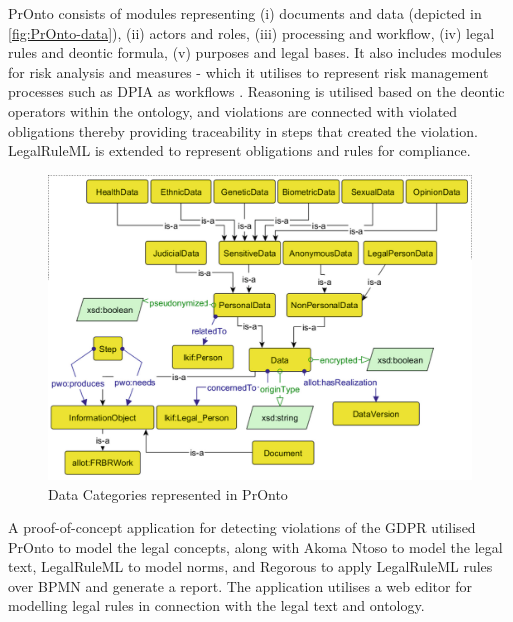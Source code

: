 PrOnto consists of modules representing (i) documents and data
(depicted in \autoref{fig:PrOnto-data}), (ii) actors and roles, (iii)
processing and workflow, (iv) legal rules and deontic formula, (v)
purposes and legal bases. It also includes modules for risk analysis
and measures - which it utilises to represent risk management
processes such as DPIA as workflows
\cite{palmirani_pronto_2018}. Reasoning is utilised based on the
deontic operators within the ontology, and violations are connected
with violated obligations thereby providing traceability in steps that
created the violation. LegalRuleML is extended to represent
obligations and rules for compliance.
\begin{figure}[htbp]
    \centering
    \includegraphics[width=0.8\linewidth]{img/PrOnto_data.png}
    \caption{Data Categories represented in PrOnto \cite{palmirani_pronto_2018}}
    \label{fig:PrOnto-data}
\end{figure}

A proof-of-concept application for detecting violations of the GDPR \cite{monica_modelling_2018} utilised PrOnto to model the legal concepts, along with Akoma Ntoso to model the legal text, LegalRuleML to model norms, and Regorous to apply LegalRuleML rules over BPMN and generate a report. The application utilises a web editor for modelling legal rules in connection with the legal text and ontology.



